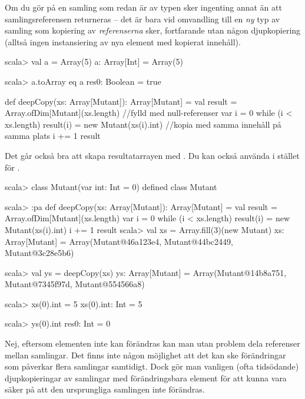 Om du gör  på en samling som redan är av typen  sker ingenting annat än att samlingsreferensen returneras -- det är bara vid omvandling till en \emph{ny} typ av samling som kopiering av \emph{referenserna} sker,  fortfarande utan någon djupkopiering (alltså ingen instansiering av nya element med kopierat innehåll).
\begin{REPL}
scala> val a = Array(5)
a: Array[Int] = Array(5)

scala> a.toArray eq a
res0: Boolean = true
\end{REPL}


\SubtaskSolved
\begin{CodeSmall}
def deepCopy(xs: Array[Mutant]): Array[Mutant] = {
  val result = Array.ofDim[Mutant](xs.length) //fylld med null-referenser
  var i = 0
  while (i < xs.length) {
    result(i) = new Mutant(xs(i).int) //kopia med samma innehåll på samma plats
    i += 1
  }
  result
}
\end{CodeSmall}
Det går också bra att skapa resultatarrayen med .
Du kan också använda  i stället för .

\SubtaskSolved
\begin{REPL}
scala> class Mutant(var int: Int = 0)
defined class Mutant

scala> :pa
def deepCopy(xs: Array[Mutant]): Array[Mutant] = {
  val result = Array.ofDim[Mutant](xs.length)
  var i = 0
  while (i < xs.length) {
    result(i) = new Mutant(xs(i).int)
    i += 1
  }
  result
}
scala> val xs = Array.fill(3)(new Mutant)
xs: Array[Mutant] = Array(Mutant@46a123e4, Mutant@44bc2449, Mutant@3c28e5b6)

scala> val ys = deepCopy(xs)
ys: Array[Mutant] = Array(Mutant@14b8a751, Mutant@7345f97d, Mutant@554566a8)

scala> xs(0).int = 5
xs(0).int: Int = 5

scala> ys(0).int
res0: Int = 0
\end{REPL}

\SubtaskSolved Nej, eftersom elementen inte kan förändras kan man utan problem dela referenser mellan samlingar. Det finns inte någon möjlighet att det kan ske förändringar som påverkar flera samlingar samtidigt.
Dock gör man vanligen (ofta tidsödande) djupkopieringar av samlingar med förändringsbara element för att kunna vara säker på att den ursprungliga samlingen inte förändras.

\QUESTEND



